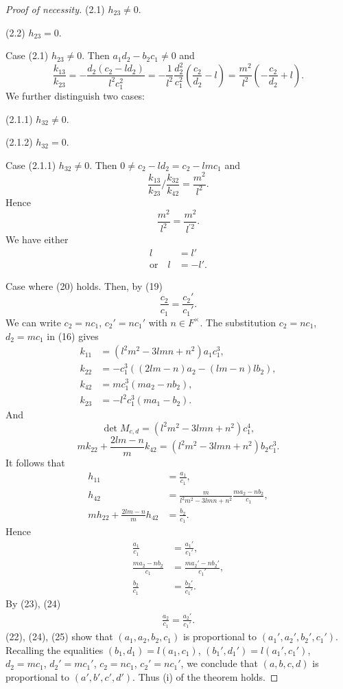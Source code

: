 \documentclass{article}
\begin{document}
\begin{proof}[Proof of necessity]
(2.1) $h_{23}\ne 0$.

(2.2) $h_{23}=0$.

Case (2.1) $h_{23}\ne 0$.  Then
$a_1d_2-b_2c_1\ne 0$ and
$$
\frac{k_{13}}{k_{23}}=-\frac{d_2(c_2-ld_2)}{l^2c_1^2}
=-\frac{1}{l^2}\frac{d_2^2}{c_1^2}(\frac{c_2}{d_2}-l)
=\frac{m^2}{l^2}(-\frac{c_2}{d_2}+l).
$$
We further distinguish two cases:

(2.1.1) $h_{32}\ne 0$.

(2.1.2) $h_{32}=0$.

Case (2.1.1) $h_{32}\ne 0$.
Then $0\ne c_2-ld_2=c_2-lm c_1$ and
$$
\frac{k_{13}}{k_{23}}/\frac{k_{32}}{k_{42}}=\frac{m^2}{l^2}.
$$
Hence
$$
\frac{m^2}{l^2}=\frac{m^2}{l^{\prime2}}.
$$
We have either
\begin{align*}
l&= l'\tag{20}\\
\text{or}\quad l&=-l'. \tag{21}
\end{align*}

Case where (20) holds.
Then, by (19)
$$
\frac{c_2}{c_1}=\frac{c_2'}{c_1'}. 
$$
We can write $c_2=n c_1$, $c_2'=n c_1'$ with $n\in F^{\times}$.
The substitution 
$c_2=n c_1$, $d_2=m c_1$ in (16) gives
\begin{align*}
k_{11}&=(l^2m^2-3lmn+n^2)a_1c_1^3,\\
k_{22}&=-c_1^3((2lm-n)a_2-(lm-n)lb_2),\\
k_{42}&=mc_1^3(ma_2-nb_2),\\
k_{23}&=-l^2c_1^3(ma_1-b_2).
\end{align*}
And
$$
\det M_{c,d}=(l^2m^2-3lmn+n^2)c_1^4,
$$
$$
mk_{22}+\frac{2lm-n}{m}k_{42}=(l^2m^2-3lmn+n^2)b_2c_1^3.
$$
It follows that
\begin{align*}
h_{11}&=\frac{a_1}{c_1},\\
h_{42}&=\frac{m}{l^2m^2-3lmn+n^2} \frac{ma_2-nb_2}{c_1},\\
mh_{22}+\frac{2lm-n}{m}h_{42}&=\frac{b_2}{c_1}.
\end{align*}
Hence
\begin{align*}
\frac{a_1}{c_1}&=\frac{a_1'}{c_1'},\tag{22}\\
\frac{ma_2-nb_2}{c_1}&=\frac{ma_2'-nb_2'}{c_1'},\tag{23}\\
\frac{b_2}{c_1}&=\frac{b_2'}{c_1'}.\tag{24}
\end{align*}
By (23), (24)
\begin{align*}
\frac{a_2}{c_1}=\frac{a_2'}{c_1'}.\tag{25}
\end{align*}
(22), (24), (25) show that
$(a_1,a_2,b_2,c_1)$ is proportional to  $(a_1',a_2',b_2',c_1')$.
Recalling the equalities
$(b_1,d_1)=l(a_1,c_1)$, $(b_1',d_1')=l(a_1',c_1')$,
$d_2=mc_1$, $d_2'=mc_1'$,
$c_2=nc_1$, $c_2'=nc_1'$,
we conclude that $(a, b,c,d)$ is proportional to  $(a',b',c',d')$.
Thus (i) of the theorem holds.


\end{proof}
\end{document}
